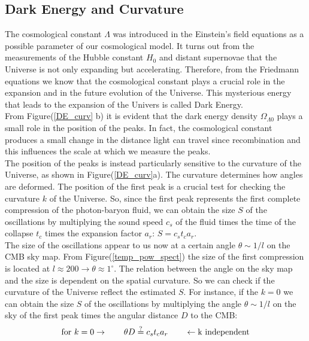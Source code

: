 \documentclass{article}
\begin{document}
\subsection{Dark Energy and Curvature}
The cosmological constant $\Lambda$ was introduced in the Einstein's field equations as a possible parameter of our cosmological model.
It turns out from the measurements of the Hubble constant $H_0$ and distant supernovae that the Universe is not only expanding but accelerating.
Therefore, from the Friedmann equations we know that the cosmological constant plays a crucial role in the expansion and in the future evolution of the Universe.
This mysterious energy that leads to the expansion of the Univers is called Dark Energy.\\
From Figure(\ref{DE_curv} b) it is evident that the dark energy density $\Omega_{\Lambda0}$ plays a small role in the position of the peaks. 
In fact, the  cosmological constant produces a small change in the distance light can travel since recombination and this influences the scale at which we measure the peaks.\\
The position of the peaks is instead particularly sensitive to the curvature of the Universe, as shown in Figure(\ref{DE_curv}a).
The curvature determines how angles are deformed.
The position of the first peak is a crucial test for checking the curvature $k$ of the Universe.
So, since the first peak represents the first complete compression of the photon-baryon fluid, we can obtain the size $S$ of the oscillations by multiplying the sound speed $c_s$ of the fluid times the time of the collapse $t_c$ times the expansion factor $a_r$: $S =c_s t_c a_r $.\\
The size of the oscillations appear to us now at a certain angle $\theta \sim 1/l$ on the CMB sky map.
From Figure(\ref{temp_pow_spect}) the size of the first compression is located at $l\approx200 \rightarrow \theta \approx 1^\circ$.
The relation between the angle on the sky map and the size is dependent on the spatial curvature.
So we can check if the curvature of the Universe reflect the estimated $S$.
For instance, if the $k=0$ we can obtain the size $S$ of the oscillations by multiplying the angle $\theta \sim 1/l$ on the sky of the first peak times the angular distance $D$ to the CMB:
$$
\text{for } k=0 \rightarrow \qquad \theta D \mathrel{\stackon[1pt]{$=$}{$\scriptstyle?$}} c_s t_c a_r \qquad \leftarrow \text{k independent}
$$
\end{document}
